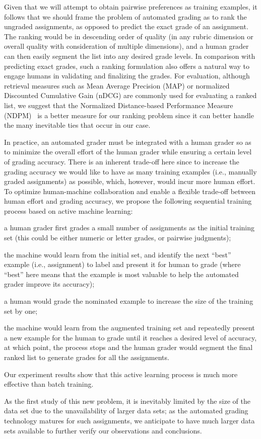 Given that we will attempt to obtain pairwise preferences as training
examples, it follows that we should frame the problem of automated grading
as to rank the ungraded assignments, as opposed to predict the exact grade
of an assignment. The ranking would be in descending order of quality (in
any rubric dimension or overall quality with consideration of multiple
dimensions), and a human grader can  then easily segment the list into any
desired grade levels.  In comparison with predicting exact grades, such a
ranking formulation also offers a natural way to engage humans in
validating and finalizing the grades.  For evaluation, although retrieval
measures such as Mean Average Precision (MAP) or normalized Discounted
Cumulative Gain (nDCG) are commonly used for evaluating a ranked list, we
suggest that the Normalized Distance-based Performance Measure
(NDPM)~\cite{Yao:1995:JASIS} is a better measure for our ranking problem
since it can better handle the many inevitable ties that occur in our case.

In practice, an automated grader must be integrated with a human grader so
as to minimize the overall effort of the human grader while ensuring a
certain level of grading accuracy. There is an inherent trade-off here since
to increase the grading accuracy we would like to have as many training
examples (i.e., manually graded assignments) as possible, which, however,
would incur more human effort. To optimize human-machine collaboration and
enable a flexible trade-off between human effort and grading accuracy, we
propose the following sequential training process based on active machine
learning:
\begin{enumerate*}[label=\itshape(\arabic*)\upshape]
  \item a human grader first grades a small number of assignments as the
    initial training set (this could be either numeric or letter grades, or
    pairwise judgments);
  \item the machine would learn from the initial set, and identify the next
    ``best'' example (i.e., assignment) to label and present it for human
    to grade (where ``best'' here means that the example is most valuable
    to help the automated grader improve its accuracy);
  \item a human would grade the nominated example to increase the size of
    the training set by one;
  \item the machine would learn from the augmented training set and
    repeatedly present a new example for the human to grade until it
    reaches a desired level of accuracy, at which point, the process stops
    and the human grader would segment the final ranked list to generate
    grades for all the assignments.
\end{enumerate*}
Our experiment results show that this active learning process is much
more effective than batch training.

As the first study of this new problem, it is inevitably limited by the
size of the data set due to the unavailability of larger data sets; as the
automated grading technology matures for such assignments, we anticipate to
have much larger data sets available to further verify our observations and
conclusions.
